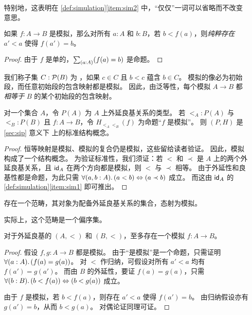 特别地，这表明在 \cref{def:simulation}\ref{item:sim2} 中，``仅仅''一词可以省略而不改变意思。

\begin{cor}
  如果 $f:A\to B$ 是模拟，那么对所有 $a:A$ 和 $b:B$，若 $b<f(a)$，则\emph{纯粹存在} $a'<a$ 使得 $f(a')=b$。
\end{cor}

\begin{proof}
  由于 $f$ 是单的，$\sm{a:A} (f(a)=b)$ 是命题。
\end{proof}

我们称子集 $C :\power B$ 为
%
%
，如果 $c\in C$ 且 $b<c$ 蕴含 $b\in C$。
模拟的像必为初始段，而任意初始段的包含映射都是模拟。
因此，由泛等性，每个模拟 $A\to B$ 都\emph{相等于} $B$ 的某个初始段的包含映射。

\begin{thm}
  对一个集合 $A$，令 $P(A)$ 为 $A$ 上外延良基关系的类型。
  若 $\mathord{<_A} : P(A)$ 与 $\mathord{<_B} : P(B)$ 且 $f:A\to B$，令 $H_{\mathord{<_A}\mathord{<_B}}(f)$ 为命题``$f$ 是模拟''。
  则 $(P,H)$ 是 \cref{sec:sip} 意义下 \uset 上的标准结构概念。
\end{thm}

\begin{proof}
  恒等映射是模拟、模拟的复合仍是模拟，这些留给读者验证。
  因此，模拟构成了一个结构概念。
  为验证标准性，我们须证：若 $<$ 和 $\prec$ 是 $A$ 上的两个外延良基关系，且 $\idfunc[A]$ 在两个方向都是模拟，则 $<$ 与 $\prec$ 相等。
  由于外延性和良基性都是命题，为此只需 $\fall{a,b:A} (a<b) \Leftrightarrow (a\prec b)$ 成立。
  而这由 $\idfunc[A]$ 的 \cref{def:simulation}\ref{item:sim1} 即可推出。
\end{proof}

\begin{cor}\label{thm:wfcat}
  存在一个范畴，其对象为配备外延良基关系的集合，态射为模拟。
\end{cor}

实际上，这个范畴是一个偏序集。

\begin{lem}
  对于外延良基的 $(A,<)$ 和 $(B,<)$，至多存在一个模拟 $f:A\to B$。
\end{lem}

\begin{proof}
  假设 $f,g:A\to B$ 都是模拟。
  由于``是模拟''是一个命题，只需证明 $\fall{a:A}(f(a)=g(a))$。
  对 $<$ 作归纳，可假设对所有 $a'<a$ 均有 $f(a')=g(a')$。
  而由 $B$ 的外延性，要证 $f(a)=g(a)$，只需 $\fall{b:B}(b<f(a)) \Leftrightarrow (b<g(a))$ 成立。

  由于 $f$ 是模拟，若 $b<f(a)$，则存在 $a'<a$ 使得 $f(a')=b$。
  由归纳假设亦有 $g(a')=b$，从而 $b<g(a)$。
  对偶论证同理可证。
\end{proof}

